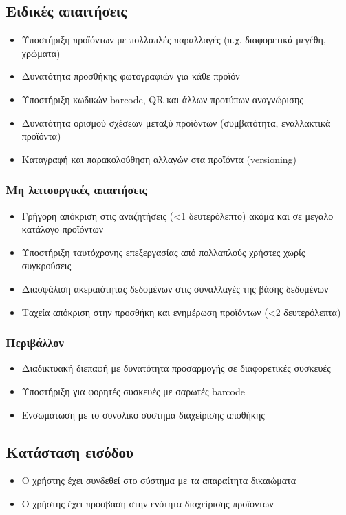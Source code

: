 \documentclass[12pt,a4paper,twoside]{book}
\begin{document}
\subsection{Ειδικές απαιτήσεις} %
\begin{itemize}
  \item Υποστήριξη προϊόντων με πολλαπλές παραλλαγές (π.χ. διαφορετικά μεγέθη, χρώματα) %
  \item Δυνατότητα προσθήκης φωτογραφιών για κάθε προϊόν
  \item Υποστήριξη κωδικών barcode, QR και άλλων προτύπων αναγνώρισης %
  \item Δυνατότητα ορισμού σχέσεων μεταξύ προϊόντων (συμβατότητα, εναλλακτικά προϊόντα)
  \item Καταγραφή και παρακολούθηση αλλαγών στα προϊόντα (versioning)
\end{itemize}

\subsubsection{Μη λειτουργικές απαιτήσεις}
\begin{itemize}
  \item Γρήγορη απόκριση στις αναζητήσεις (<1 δευτερόλεπτο) ακόμα και σε μεγάλο κατάλογο προϊόντων %
  \item Υποστήριξη ταυτόχρονης επεξεργασίας από πολλαπλούς χρήστες χωρίς συγκρούσεις
  \item Διασφάλιση ακεραιότητας δεδομένων στις συναλλαγές της βάσης δεδομένων %
  \item Ταχεία απόκριση στην προσθήκη και ενημέρωση προϊόντων (<2 δευτερόλεπτα) %
\end{itemize}

\subsubsection{Περιβάλλον}
\begin{itemize}
  \item Διαδικτυακή διεπαφή με δυνατότητα προσαρμογής σε διαφορετικές συσκευές %
  \item Υποστήριξη για φορητές συσκευές με σαρωτές barcode
  \item Ενσωμάτωση με το συνολικό σύστημα διαχείρισης αποθήκης %
\end{itemize}

\subsection{Κατάσταση εισόδου} %
\begin{itemize}
  \item Ο χρήστης έχει συνδεθεί στο σύστημα με τα απαραίτητα δικαιώματα %
  \item Ο χρήστης έχει πρόσβαση στην ενότητα διαχείρισης προϊόντων %
\end{itemize}
\end{document}
